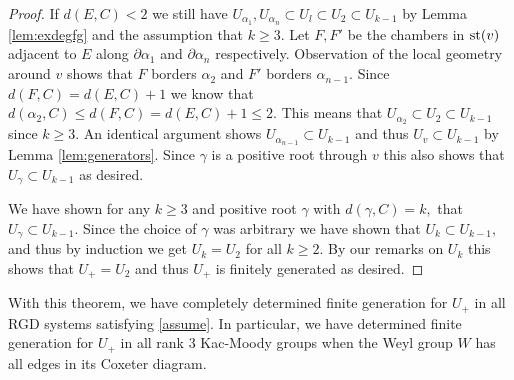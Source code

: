 \documentclass[class=book, crop=false]{standalone}
\begin{document}
\begin{proof}
	If $d(E,C)<2$ we still have $U_{\alpha_1},U_{\alpha_n}\subset U_l\subset U_2\subset U_{k-1}$ by Lemma \ref{lem:exdegfg} and the assumption that $k\ge 3.$ Let $F,F'$ be the chambers in $\mathrm{st}(v)$ adjacent to $E$ along $\partial\alpha_1$ and $\partial\alpha_n$ respectively. Observation of the local geometry around $v$ shows that $F$ borders $\alpha_2$ and $F'$ borders $\alpha_{n-1}.$ Since $d(F,C)=d(E,C)+1$ we know that $d(\alpha_2,C)\le d(F,C)=d(E,C)+1\le 2.$ This means that $U_{\alpha_2}\subset U_2\subset U_{k-1}$ since $k\ge 3.$ An identical argument shows $U_{\alpha_{n-1}}\subset U_{k-1}$ and thus $U_v\subset U_{k-1}$ by Lemma \ref{lem:generators}. Since $\gamma$ is a positive root through $v$ this also shows that $U_\gamma \subset U_{k-1}$ as desired.

	We have shown for any $k\ge 3$ and positive root $\gamma$ with $d(\gamma,C)=k,$ that $U_\gamma\subset U_{k-1}.$ Since the choice of $\gamma$ was arbitrary we have shown that $U_k\subset U_{k-1},$ and thus by induction we get $U_k=U_2$ for all $k\ge 2.$ By our remarks on $U_k$ this shows that $U_+=U_2$ and thus $U_+$ is finitely generated as desired.
\end{proof}

With this theorem, we have completely determined finite generation for $U_+$ in all RGD systems satisfying \eqref{assume}. In particular, we have determined finite generation for $U_+$ in all rank 3 Kac-Moody groups when the Weyl group $W$ has all edges in its Coxeter diagram. 
\end{document}

